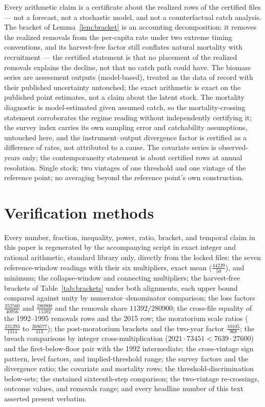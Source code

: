 \documentclass[10pt,twocolumn]{article}
\theoremstyle{plain}
\theoremstyle{remark}
\begin{document}
Every arithmetic claim is a certificate about the realized rows of the
certified files --- not a forecast, not a stochastic model, and not a
counterfactual catch analysis. The bracket of
Lemma~\ref{lem:bracket} is an accounting decomposition: it removes the
realized removals from the per-capita rate under two extreme timing
conventions, and its harvest-free factor still conflates natural
mortality with recruitment --- the certified statement is that no
placement of the realized removals explains the decline, not that no
catch path could have. The biomass series are assessment outputs
(model-based), treated as the data of record with their published
uncertainty untouched; the exact arithmetic is exact on the published
point estimates, not a claim about the latent stock. The mortality
diagnostic is model-estimated given assumed catch, so the
mortality-crossing statement corroborates the regime reading without
independently certifying it; the survey index carries its own sampling
error and catchability assumptions, untouched here, and the
instrument--output divergence factor is certified as a difference of
rates, not attributed to a cause. The covariate series is
observed-years only; the contemporaneity statement is about certified
rows at annual resolution. Single stock; two vintages of one threshold
and one vintage of the reference point; no averaging beyond the
reference point's own construction.

\section{Verification methods}\label{methods}

Every number, fraction, inequality, power, ratio, bracket, and
temporal claim in this paper is regenerated by the accompanying script
in exact integer and rational arithmetic, standard library only,
directly from the locked files: the seven reference-window readings
with their six multipliers, exact mean
(\(\tfrac{44229}{50}\)), and minimum; the collapse-window and
connecting multipliers; the harvest-free brackets of
Table~\ref{tab:brackets} under both alignments, each upper bound
compared against unity by numerator--denominator comparison; the loss
factors \(\tfrac{352560}{40956}\) and \(\tfrac{280900}{11392}\) and
the removals share \(11392/280900\); the cross-file equality of the
1992--1995 removals rows and the 2015 row; the moratorium scale ratios
(\(\tfrac{231293}{1314}\) to \(\tfrac{268677}{413}\)); the
post-moratorium brackets and the two-year factor
\(\tfrac{10105}{968}\); the breach comparisons by integer
cross-multiplication (\(2021 \cdot 73451 < 7639 \cdot 27600\)) and the
first-below-floor pair with the 1992 intermediate; the cross-vintage
sign pattern, level factors, and implied-threshold range; the survey
factors and the divergence ratio; the covariate and mortality rows;
the threshold-discrimination below-sets; the sustained sixteenth-step
comparison; the two-vintage re-crossings, outcome values, and removals
range; and every headline number of this text asserted present
verbatim.
\end{document}
